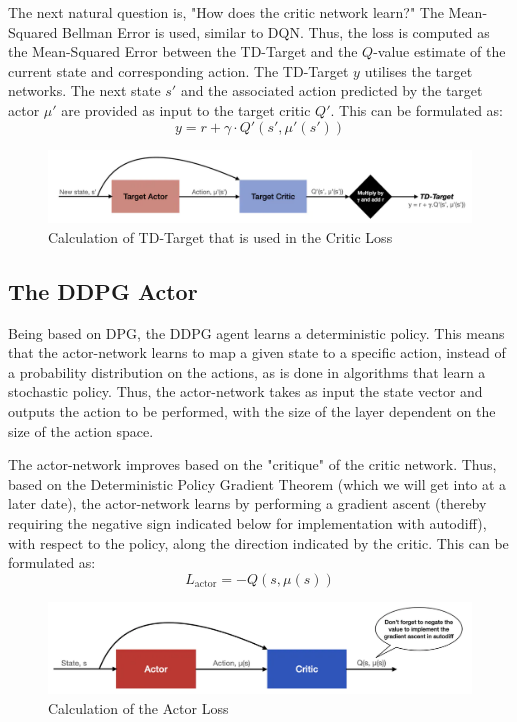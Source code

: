 The next natural question is, "How does the critic network learn?" The Mean-Squared 
Bellman Error is used, similar to DQN. Thus, the loss is computed as the Mean-Squared 
Error between the TD-Target and the $Q$-value estimate of the current state and 
corresponding action. The TD-Target $y$ utilises the target networks. The next state 
$s'$ and the associated action predicted by the target actor $\mu'$ are provided as 
input to the target critic $Q'$. This can be formulated as:
$$
y = r + \gamma \cdot Q'(s', \mu'(s'))
$$

\begin{figure}[h]
\centering
\includegraphics[scale=0.5]{pix/td3/ddpg_critic_loss.png}
\caption{Calculation of TD-Target that is used in the Critic Loss}
\end{figure}


\subsection{The DDPG Actor}

Being based on DPG, the DDPG agent learns a deterministic policy. This means that 
the actor-network learns to map a given state to a specific action, instead of a 
probability distribution on the actions, as is done in algorithms that learn a 
stochastic policy. Thus, the actor-network takes as input the state vector and 
outputs the action to be performed, with the size of the layer dependent on the 
size of the action space.

The actor-network improves based on the "critique" of the critic network. Thus, 
based on the Deterministic Policy Gradient Theorem (which we will get into at a 
later date), the actor-network learns by performing a gradient ascent (thereby 
requiring the negative sign indicated below for implementation with autodiff), 
with respect to the policy, along the direction indicated by the critic. This 
can be formulated as:
$$
L_{\text{actor}} = - Q(s, \mu(s))
$$

\begin{figure}[h]
\centering
\includegraphics[scale=0.5]{pix/td3/ddpg_actor_loss.png}
\caption{Calculation of the Actor Loss}
\end{figure}


